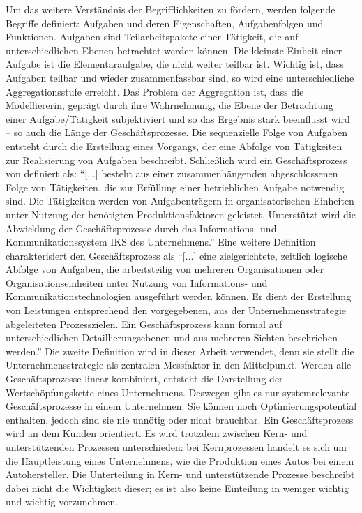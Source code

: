 Um das weitere Verständnis der Begrifflichkeiten zu fördern, werden folgende Begriffe definiert\autocite[vgl.][S.\,4-5]{staud_geschaftsprozessanalyse_2006}: Aufgaben und deren Eigenschaften, Aufgabenfolgen und Funktionen. Aufgaben sind Teilarbeitspakete einer Tätigkeit, die auf unterschiedlichen Ebenen betrachtet werden können. Die kleinste Einheit einer Aufgabe ist die Elementaraufgabe, die nicht weiter teilbar ist. Wichtig ist, dass Aufgaben teilbar und wieder zusammenfassbar sind, so wird eine unterschiedliche Aggregationsstufe erreicht. Das Problem der Aggregation ist, dass die Modelliererin, geprägt durch ihre Wahrnehmung, die Ebene der Betrachtung einer Aufgabe/Tätigkeit subjektiviert und so das Ergebnis stark beeinflusst wird -- so auch die Länge der Geschäftsprozesse. Die sequenzielle Folge von Aufgaben entsteht durch die Erstellung eines Vorgangs, der eine Abfolge von Tätigkeiten zur Realisierung von Aufgaben beschreibt. Schließlich wird ein Geschäftsprozess von \cite{staud_geschaftsprozessanalyse_2006} definiert als: \enquote{[...] besteht aus einer zusammenhängenden abgeschlossenen Folge von Tätigkeiten, die zur Erfüllung einer betrieblichen Aufgabe notwendig sind. Die Tätigkeiten werden von Aufgabenträgern in organisatorischen Einheiten unter Nutzung der benötigten Produktionsfaktoren geleistet. Unterstützt wird die Abwicklung der Geschäftsprozesse durch das Informations- und Kommunikationssystem IKS des Unternehmens.}\autocite[][S.\,9]{staud_geschaftsprozessanalyse_2006} Eine weitere Definition charakterisiert den Geschäftsprozess als \enquote{[...] eine zielgerichtete, zeitlich logische Abfolge von Aufgaben, die arbeitsteilig von mehreren Organisationen oder Organisationseinheiten unter Nutzung von Informations- und Kommunikationstechnologien ausgeführt werden können. Er dient der Erstellung von Leistungen entsprechend den vorgegebenen, aus der Unternehmensstrategie abgeleiteten Prozesszielen. Ein Geschäftsprozess kann formal auf unterschiedlichen Detaillierungsebenen und aus mehreren Sichten beschrieben werden.}\autocite[][S.\,41]{gadatsch_grundkurs_2010} Die zweite Definition wird in dieser Arbeit verwendet, denn sie stellt die Unternehmensstrategie als zentralen Messfaktor in den Mittelpunkt. Werden alle Geschäftsprozesse linear kombiniert, entsteht die Darstellung der Wertschöpfungskette eines Unternehmens. Deswegen gibt es nur systemrelevante Geschäftsprozesse in einem Unternehmen. Sie können noch Optimierungspotential enthalten, jedoch sind sie nie unnötig oder nicht brauchbar. Ein Geschäftsprozess wird an dem Kunden orientiert. Es wird trotzdem zwischen Kern- und unterstützenden Prozessen unterschieden: bei Kernprozessen handelt es sich um die Hauptleistung eines Unternehmens, wie die Produktion eines Autos bei einem Autohersteller. Die Unterteilung in Kern- und unterstützende Prozesse beschreibt dabei nicht die Wichtigkeit dieser; es ist also keine Einteilung in weniger wichtig und wichtig vorzunehmen.\autocite[vgl.][S.\,11]{staud_geschaftsprozessanalyse_2006} \par

